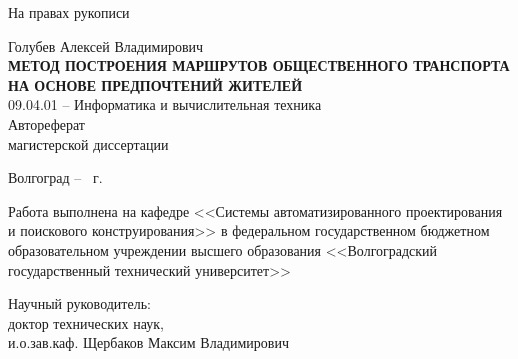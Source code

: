 \documentclass[a5paper, 10pt]{article}
\begin{document}
    \begin{titlepage}
        \hspace{15em}На правах рукописи\\
        \begin{center}
            \vspace{8em}Голубев Алексей Владимирович\\
            \large\vspace{2em}\textbf{\MakeUppercase{Метод построения маршрутов общественного 
                транспорта на основе предпочтений жителей}}\normalsize\\
            \vspace{8em}09.04.01 -- Информатика и вычислительная техника\\
            \vspace{8em}Автореферат\\магистерской диссертации
        \end{center}
        \vfill
        \begin{center}
            Волгоград -- \the\year\ г.
        \end{center}
        \newpage
        \thispagestyle{empty}
        Работа выполнена на кафедре <<Системы автоматизированного проектирования и поискового 
        конструирования>> в федеральном государственном бюджетном образовательном учреждении 
        высшего образования <<Волгоградский государственный технический университет>>\\
        \vspace{3em}\begin{flushleft}
            Научный руководитель:\\
            \hspace{2cm}доктор технических наук,\\
            \hspace{2cm}и.о.зав.каф. Щербаков Максим Владимирович\\
        \end{flushleft}
    \end{titlepage}
    \newpage
    \onehalfspacing
    \setcounter{page}{3}
    
\end{document}

